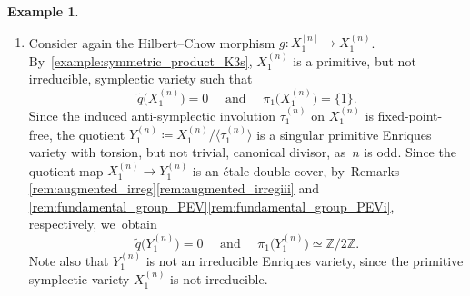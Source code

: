 \documentclass[10pt]{amsart}
\newenvironment{enumeratea}
{\bgroup\def\theenumi{\alph{enumi}}\begin{enumerate}}
{\end{enumerate}\egroup}
\renewcommand\theenumi{\roman{enumi}}
\let\ts\textstyle
\theoremstyle{plain}
\theoremstyle{definition}
\newtheorem{exa}[thm]{Example}
\newcommand{\Z}{\mathbb{Z}}
\newcommand{\R}{\mathbb{R}}
\DeclareMathOperator{\NEb}{\overline{\mathrm{NE}}}
\begin{document}
\begin{exa}
\begin{enumeratea}
Consider now two $(-2)$-curves $E_{i_1}$ and $D_{i_1}$ on $X_1$ and the corresponding two Lagrangian submanifolds $E_{i_1}^{[n]}\simeq \mathbb{P}^n$ and $D_{i_1}^{[n]}\simeq \mathbb{P}^n$ of $X_1^{[n]}$, respectively.
Let $l$ be a line in $E_{i_1}^{[n]}$ and let $l'$ be the image of $l$ under $\tau_1^{[n]}$ in $D_{i_1}^{[n]}$. Then $R=\R_{\geq 0}(\ell+\ell')$ is an extremal ray of $\NEb \bigl(X_1^{[n]} \bigr)^{\langle \tau_1^{[n]} \rangle}$, where $\ell$ and $\ell'$ denote the classes of the lines $l \subset E_{i_1}^{[n]}$ and $l' \subset D_{i_1}^{[n]}$, respectively.
Let $\theta \colon X_1^{[n]} \to Z$ be the $\langle \tau_1^{[n]}\rangle$-equivariant flopping contraction of $R$. Let $A$ be an integral ample divisor on $Z$, let $H$ be an integral ample divisor on $X_1^{[n]}$, and consider the divisor $D \coloneqq \theta^*(A)-\varepsilon \bigl(H+\tau_1^{[n]}(H) \bigr)$ on $X_1^{[n]}$, where $0< \varepsilon \ll 1$. We~may assume that the $\langle \tau_1^{[n]} \rangle$-pair $\bigl(X_1^{[n]},D \bigr)$ is klt and perform the $\langle \tau_1^{[n]} \rangle$-equivariant $(K_{X_1^{[n]}}+D)$-flip of $R$, which is also a composition of algebraic elementary Mukai flops:
\[
\begin{tikzcd}
X_1^{[n]} \arrow[rr, dashed, "\ts \varphi"] \arrow[dr, "\ts \theta" swap] && X' \arrow[dl, "\ts \theta'"] \\
& Z
\end{tikzcd}
\]
By \autoref{prop:Mukai_flop_EM}, see also the proof of \cite[Prop.\,4.2]{OS11b}, we~know that $X'$ is a projective IHS manifold and that the induced $\langle \tau_1^{[n]} \rangle$-action on $X'$ remains free, so~the quotient $Y' \coloneqq X'/ \langle \tau_1^{[n]} \rangle$ is an Enriques manifold of dimension $2n$ and index $d=2$.

\item\label{example:PEV_from_Cataneseb}
Consider again the Hilbert--Chow morphism
$ g \colon X_1^{[n]} \to X_1^{(n)} $. By~\autoref{example:symmetric_product_K3s}, $X_1^{(n)}$ is a primitive, but not irreducible, symplectic variety such that
\[
\widetilde{q} \bigl(X_1^{(n)} \bigr) = 0 \quad \text{ and } \quad \pi_1 \bigl(X_1^{(n)} \bigr) = \{ 1 \}.
\]
Since the induced anti-symplectic involution $\tau_1^{(n)}$ on $X_1^{(n)}$ is fixed-point-free, the quotient $Y_1^{(n)} \coloneqq X_1^{(n)} / \langle \tau_1^{(n)} \rangle$ is a singular primitive Enriques variety with torsion, but not trivial, canonical divisor, as~$n$ is odd. Since the quotient map
$X_1^{(n)} \to Y_1^{(n)}$
is an étale double cover, by~Remarks \ref{rem:augmented_irreg}\eqref{rem:augmented_irregiii} and \ref{rem:fundamental_group_PEV}\eqref{rem:fundamental_group_PEVi}, respectively, we~obtain
\[
\widetilde{q} \bigl(Y_1^{(n)} \bigr) = 0 \quad \text{ and } \quad \pi_1 \bigl(Y_1^{(n)} \bigr) \simeq \Z / 2\Z.
\]
Note also that $Y_1^{(n)}$ is not an irreducible Enriques variety, since the primitive symplectic variety $X_1^{(n)}$ is not irreducible.


\end{enumeratea}
\end{exa}
\end{document}
